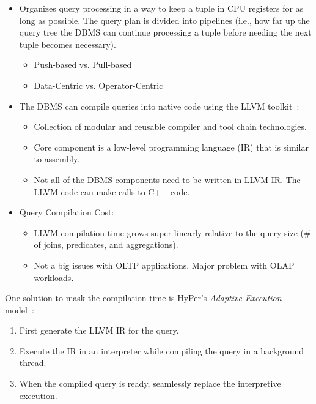 \documentclass[11pt]{article}
\begin{document}
\begin{itemize}
    \item
    Organizes query processing in a way to keep a tuple in CPU registers for as long as 
    possible. The query plan is divided into pipelines (i.e., how far up the query tree 
    the DBMS can continue processing a tuple before needing the next tuple becomes necessary).
    \begin{itemize}
        \item
        Push-based vs. Pull-based
        
        \item
        Data-Centric vs. Operator-Centric
    \end{itemize}
    
    \item
    The DBMS can compile queries into native code using the LLVM toolkit~\cite{lattner04}:
    \begin{itemize}
        \item
        Collection of modular and reusable compiler and tool chain technologies.
        
        \item
        Core component is a low-level programming language (IR) that is similar to assembly.
        
        \item
        Not all of the DBMS components need to be written in LLVM IR. The LLVM code can 
        make calls to C++ code.
    \end{itemize}
    
    \item Query Compilation Cost:
    \begin{itemize}
        \item
        LLVM compilation time grows super-linearly relative to the query size (\# of joins, 
        predicates, and aggregations).
        
        \item
        Not a big issues with OLTP applications. Major problem with OLAP workloads.
    \end{itemize}
\end{itemize}
        
One solution to mask the compilation time is HyPer's \textit{Adaptive Execution} 
model~\cite{kohn18}:
\begin{enumerate}
    \item
    First generate the LLVM IR for the query.
    
    \item
    Execute the IR in an interpreter while compiling the query in a background thread.
    
    \item
    When the compiled query is ready, seamlessly replace the interpretive execution.
\end{enumerate}
\end{document}
